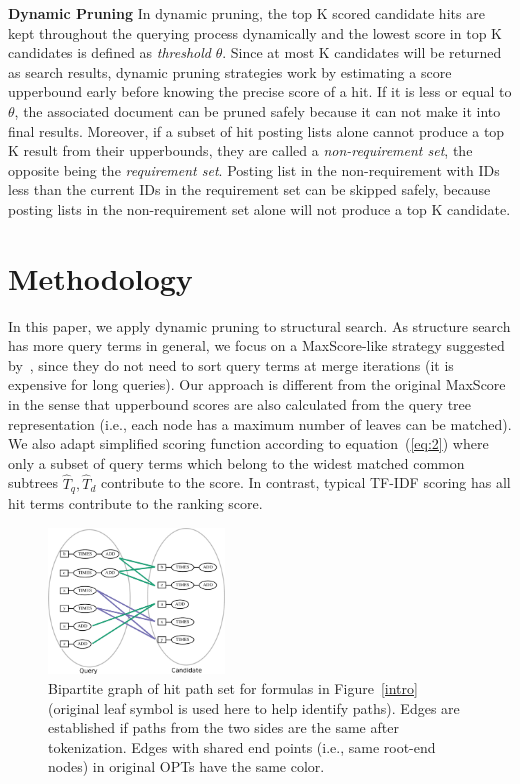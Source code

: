\documentclass[runningheads]{llncs}
\begin{document}
\vspace{0.1in}
\noindent\textbf{Dynamic Pruning}\; In dynamic pruning, the top K scored candidate hits are kept throughout the querying process dynamically and the lowest score in top K candidates is defined as \textit{threshold} $\theta$. Since at most K candidates will be returned as search results, dynamic pruning strategies work by estimating a score upperbound early before knowing the precise score of a hit.
%
If it is less or equal to $\theta$, the associated document can be pruned safely because it can not make it into final results.
Moreover, if a subset of hit posting lists alone cannot produce a top K result from their upperbounds, they are called a \textit{non-requirement set}, the opposite being the \textit{requirement set}.
%
Posting list in the non-requirement with IDs less than the current IDs in the requirement set can be skipped safely, because posting lists in the non-requirement set alone will not produce a top K candidate.

\section{Methodology}
\label{strategy}
In this paper, we apply dynamic pruning to structural search.
As structure search has more query terms in general, we focus on a MaxScore-like strategy suggested by~\cite{Shandongdong2012, antonio2019}, since they do not need to sort query terms at merge iterations (it is expensive for long queries).
%
Our approach is different from the original MaxScore in the sense that upperbound scores are also calculated from the query tree representation (i.e., each node has a maximum number of leaves can be matched).
We also adapt simplified scoring function according to equation~(\ref{eq:2})
where only a subset of query terms which belong to the widest matched common subtrees $\hat{T}_q, \hat{T}_d$ contribute to the score.
In contrast, typical TF-IDF scoring has all hit terms contribute to the ranking score.

\begin{figure}[!t]
\begin{center}
\includegraphics[width=1.84in]{fig/bipartile.eps}
\caption{Bipartite graph of hit path set for formulas in Figure~\ref{intro} (original leaf symbol is used here to help identify paths). Edges are established if paths from the two sides are the same after tokenization. Edges with shared end points (i.e., same root-end nodes) in original OPTs have the same color. }
\label{bipart}
\end{center}
\end{figure}
\end{document}
